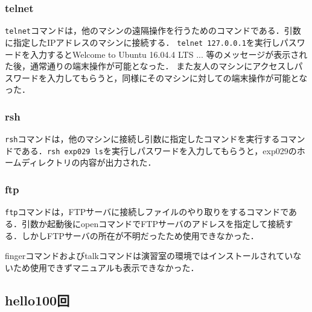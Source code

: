 \documentclass[a4j,10pt,titlepage]{jsarticle}
\begin{document}
\subsubsection{telnet}
\verb|telnet|コマンドは，他のマシンの遠隔操作を行うためのコマンドである．引数に指定したIPアドレスのマシンに接続する．
\verb|telnet 127.0.0.1|を実行しパスワードを入力するとWelcome to Ubuntu 16.04.4 LTS ... 等のメッセージが表示された後，通常通りの端末操作が可能となった．
また友人のマシンにアクセスしパスワードを入力してもらうと，同様にそのマシンに対しての端末操作が可能となった．

\subsubsection{rsh}
\verb|rsh|コマンドは，他のマシンに接続し引数に指定したコマンドを実行するコマンドである．\verb|rsh exp029 ls|を実行しパスワードを入力してもらうと，exp029のホームディレクトリの内容が出力された．

\subsubsection{ftp}
\verb|ftp|コマンドは，FTPサーバに接続しファイルのやり取りをするコマンドである．引数か起動後にopenコマンドでFTPサーバのアドレスを指定して接続する．しかしFTPサーバの所在が不明だったため使用できなかった．

fingerコマンドおよびtalkコマンドは演習室の環境ではインストールされていないため使用できずマニュアルも表示できなかった．

\subsection{hello100回}
\end{document}
